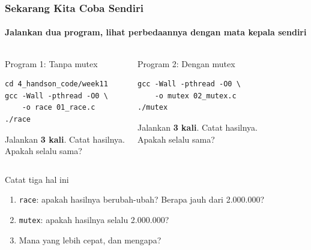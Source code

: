 \documentclass[t,aspectratio=169,xcolor=dvipsnames]{beamer}
\begin{document}
\begin{frame}[fragile,shrink=5]
    \frametitle{Sekarang Kita Coba Sendiri}
    \framesubtitle{Jalankan dua program, lihat perbedaannya dengan mata kepala sendiri}
    \small

    \begin{columns}[T]
        \begin{alertblock}{Program 1: Tanpa mutex}
\begin{lstlisting}[basicstyle=\ttfamily\scriptsize]
cd 4_handson_code/week11
gcc -Wall -pthread -O0 \
    -o race 01_race.c
./race
\end{lstlisting}
            Jalankan \textbf{3 kali}. Catat hasilnya.\\
            Apakah selalu sama?
        \end{alertblock}

        \begin{exampleblock}{Program 2: Dengan mutex}
\begin{lstlisting}[basicstyle=\ttfamily\scriptsize]
gcc -Wall -pthread -O0 \
    -o mutex 02_mutex.c
./mutex
\end{lstlisting}
            Jalankan \textbf{3 kali}. Catat hasilnya.\\
            Apakah selalu sama?
        \end{exampleblock}
    \end{columns}

    \begin{block}{Catat tiga hal ini}
        \footnotesize
        \begin{enumerate}
            \item \texttt{race}: apakah hasilnya berubah-ubah? Berapa jauh dari 2.000.000?
            \item \texttt{mutex}: apakah hasilnya selalu 2.000.000?
            \item Mana yang lebih cepat, dan mengapa?
        \end{enumerate}
    \end{block}
\end{frame}
\end{document}
